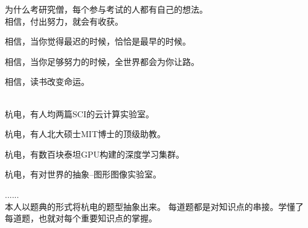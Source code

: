 \begin{overview}
\thispagestyle{empty}

为什么考研究僧，每个参与考试的人都有自己的想法。
~\\

相信，付出努力，就会有收获。

相信，当你觉得最迟的时候，恰恰是最早的时候。

相信，当你足够努力的时候，全世界都会为你让路。

相信，读书改变命运。

~\\

杭电，有人均两篇SCI的云计算实验室。

杭电，有人北大硕士MIT博士的顶级助教。

杭电，有数百块泰坦GPU构建的深度学习集群。

杭电，有对世界的抽象--图形图像实验室。

......
~\\

本人以题典的形式将杭电的题型抽象出来。
每道题都是对知识点的串接。学懂了每道题，也就对每个重要知识点的掌握。

\end{overview}
